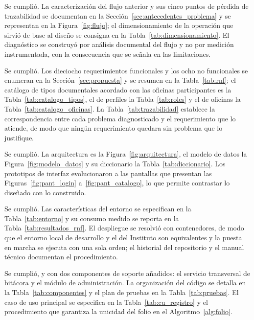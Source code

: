 \begin{description}[leftmargin=0pt,font=\bfseries,itemsep=0.55em,parsep=0pt]
  \item[1. Diagnosticar el proceso vigente.]\leavevmode
  Se cumplió. La caracterización del flujo anterior y sus cinco puntos de pérdida de trazabilidad se documentan en la Sección~\ref{sec:antecedentes_problema} y se representan en la Figura~\ref{fig:flujo}; el dimensionamiento de la operación que sirvió de base al diseño se consigna en la Tabla~\ref{tab:dimensionamiento}. El diagnóstico se construyó por análisis documental del flujo y no por medición instrumentada, con la consecuencia que se señala en las limitaciones.

  \item[2. Especificar los requerimientos.]\leavevmode
  Se cumplió. Los dieciocho requerimientos funcionales y los ocho no funcionales se enumeran en la Sección~\ref{sec:propuesta} y se resumen en la Tabla~\ref{tab:rnf}; el catálogo de tipos documentales acordado con las oficinas participantes es la Tabla~\ref{tab:catalogo_tipos}, el de perfiles la Tabla~\ref{tab:roles} y el de oficinas la Tabla~\ref{tab:catalogo_oficinas}. La Tabla~\ref{tab:trazabilidad} establece la correspondencia entre cada problema diagnosticado y el requerimiento que lo atiende, de modo que ningún requerimiento quedara sin problema que lo justifique.

  \item[3. Diseñar la arquitectura, el modelo de datos y los prototipos.]\leavevmode
  Se cumplió. La arquitectura es la Figura~\ref{fig:arquitectura}, el modelo de datos la Figura~\ref{fig:modelo_datos} y su diccionario la Tabla~\ref{tab:diccionario}. Los prototipos de interfaz evolucionaron a las pantallas que presentan las Figuras~\ref{fig:pant_login} a~\ref{fig:pant_catalogo}, lo que permite contrastar lo diseñado con lo construido.

  \item[4. Implementar el entorno virtualizado y el de desarrollo.]\leavevmode
  Se cumplió. Las características del entorno se especifican en la Tabla~\ref{tab:entorno} y su consumo medido se reporta en la Tabla~\ref{tab:resultados_rnf}. El despliegue se resolvió con contenedores, de modo que el entorno local de desarrollo y el del Instituto son equivalentes y la puesta en marcha se ejecuta con una sola orden; el historial del repositorio y el manual técnico documentan el procedimiento.

  \item[5. Desarrollar los cuatro módulos funcionales.]\leavevmode
  Se cumplió, y con dos componentes de soporte añadidos: el servicio transversal de bitácora y el módulo de administración. La organización del código se detalla en la Tabla~\ref{tab:componentes} y el plan de pruebas en la Tabla~\ref{tab:pruebas}. El caso de uso principal se especifica en la Tabla~\ref{tab:cu_registro} y el procedimiento que garantiza la unicidad del folio en el Algoritmo~\ref{alg:folio}.


\end{description}
